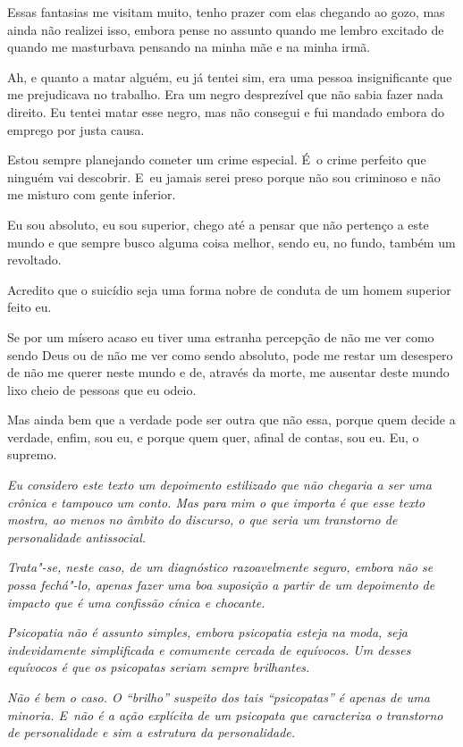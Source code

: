 Essas fantasias me visitam muito, tenho prazer com elas chegando ao
gozo, mas ainda não realizei isso, embora pense no assunto quando me
lembro excitado de quando me masturbava pensando na minha mãe e na minha irmã.

Ah, e quanto a matar alguém, eu já tentei sim, era uma pessoa
insignificante que me prejudicava no trabalho. Era um negro desprezível
que não sabia fazer nada direito. Eu tentei matar esse negro, mas não
consegui e fui mandado embora do emprego por justa causa.

Estou sempre planejando cometer um crime especial. É~o crime perfeito
que ninguém vai descobrir. E~eu jamais serei preso porque não sou
criminoso e não me misturo com gente inferior.

Eu sou absoluto, eu sou superior, chego até a pensar que não pertenço a
este mundo e que sempre busco alguma coisa melhor, sendo eu, no fundo,
também um revoltado.

Acredito que o suicídio seja uma forma nobre de conduta de um homem
superior feito eu.

Se por um mísero acaso eu tiver uma estranha percepção de não me ver
como sendo Deus ou de não me ver como sendo absoluto, pode me restar um
desespero de não me querer neste mundo e de, através da morte, me
ausentar deste mundo lixo cheio de pessoas que eu odeio.

Mas ainda bem que a verdade pode ser outra que não essa, porque quem
decide a verdade, enfim, sou eu, e porque quem quer, afinal de contas,
sou eu. Eu, o supremo.~

\begin{center}\asterisc{}\end{center}
\begingroup\small

\emph{Eu considero este texto um depoimento estilizado que não chegaria
a ser uma crônica e tampouco um conto. Mas para mim o que importa é que
esse texto mostra, ao menos no âmbito do discurso, o que seria um
transtorno de personalidade antissocial.}~

\emph{Trata"-se, neste caso, de um diagnóstico razoavelmente seguro,
embora não se possa fechá"-lo, apenas fazer uma boa suposição a partir de
um depoimento de impacto que é uma confissão cínica e chocante.}~

\emph{Psicopatia não é assunto simples, embora psicopatia esteja na
moda, seja indevidamente simplificada e comumente cercada de equívocos.
Um desses equívocos é que os psicopatas seriam sempre brilhantes.}~

\emph{Não é bem o caso. O ``brilho'' suspeito dos tais ``psicopatas'' é
apenas de uma minoria. E~não é a ação explícita de um psicopata que
caracteriza o transtorno de personalidade e sim a estrutura da
personalidade.}~

